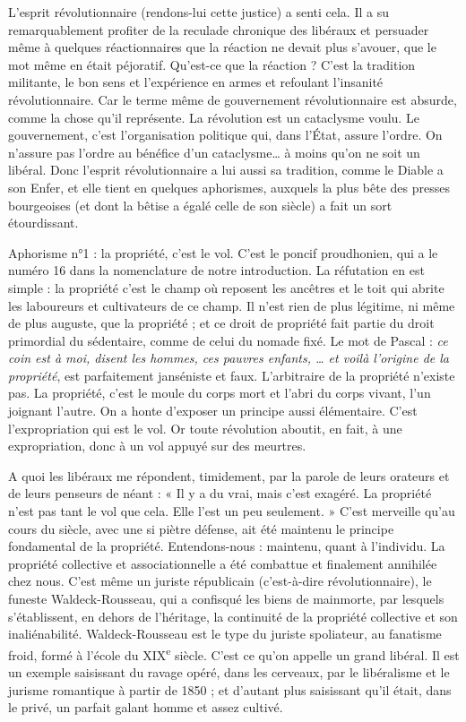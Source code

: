 \documentclass[french,twoside]{book} %
\begin{document}
L’esprit révolutionnaire (rendons-lui cette justice) a senti cela. Il a su remarquablement profiter de la reculade chronique des libéraux et persuader même à quelques réactionnaires que la réaction ne devait plus s’avouer, que le mot même en était péjoratif. Qu’est-ce que la réaction ? C’est la tradition militante, le bon sens et l’expérience en armes et refoulant l’insanité révolutionnaire. Car le terme même de gouvernement révolutionnaire est absurde, comme la chose qu’il représente. La révolution est un cataclysme voulu. Le gouvernement, c’est l’organisation politique qui, dans l’État, assure l’ordre. On n’assure pas l’ordre au bénéfice d’un cataclysme… à moins qu’on ne soit un libéral. Donc l’esprit révolutionnaire a lui aussi sa tradition, comme le Diable a son Enfer, et elle tient en quelques aphorismes, auxquels la plus bête des presses bourgeoises (et dont la bêtise a égalé celle de son siècle) a fait un sort étourdissant.\par
Aphorisme n°1 : la propriété, c’est le vol. C’est le poncif proudhonien, qui a le numéro 16 dans la nomenclature de notre introduction. La réfutation en est simple : la propriété c’est le champ où reposent les ancêtres et le toit qui abrite les laboureurs et cultivateurs de ce champ. Il n’est rien de plus légitime, ni même de plus auguste, que la propriété ; et ce droit de propriété fait partie du droit primordial du sédentaire, comme de celui du nomade fixé. Le mot de Pascal : {\itshape ce coin est à moi, disent les hommes, ces pauvres enfants, … et voilà l’origine de la propriété}, est parfaitement janséniste et faux. L’arbitraire de la propriété n’existe pas. La propriété, c’est le moule du corps mort et l’abri du corps vivant, l’un joignant l’autre. On a honte d’exposer un principe aussi élémentaire. C’est l’expropriation qui est le vol. Or toute révolution aboutit, en fait, à une expropriation, donc à un vol appuyé sur des meurtres.\par
A quoi les libéraux me répondent, timidement, par la parole de leurs orateurs et de leurs penseurs de néant : « Il y a du vrai, mais c’est exagéré. La propriété n’est pas tant le vol que cela. Elle l’est un peu seulement. » C’est merveille qu’au cours du siècle, avec une si piètre défense, ait été maintenu le principe fondamental de la propriété. Entendons-nous : maintenu, quant à l’individu. La propriété collective et associationnelle a été combattue et finalement annihilée chez nous. C’est même un juriste républicain (c’est-à-dire révolutionnaire), le funeste Waldeck-Rousseau, qui a confisqué les biens de mainmorte, par lesquels s’établissent, en dehors de l’héritage, la continuité de la propriété collective et son inaliénabilité. Waldeck-Rousseau est le type du juriste spoliateur, au fanatisme froid, formé à l’école du XIX\textsuperscript{e} siècle. C’est ce qu’on appelle un grand libéral. Il est un exemple saisissant du ravage opéré, dans les cerveaux, par le libéralisme et le jurisme romantique à partir de 1850 ; et d’autant plus saisissant qu’il était, dans le privé, un parfait galant homme et assez cultivé.\par
\end{document}

